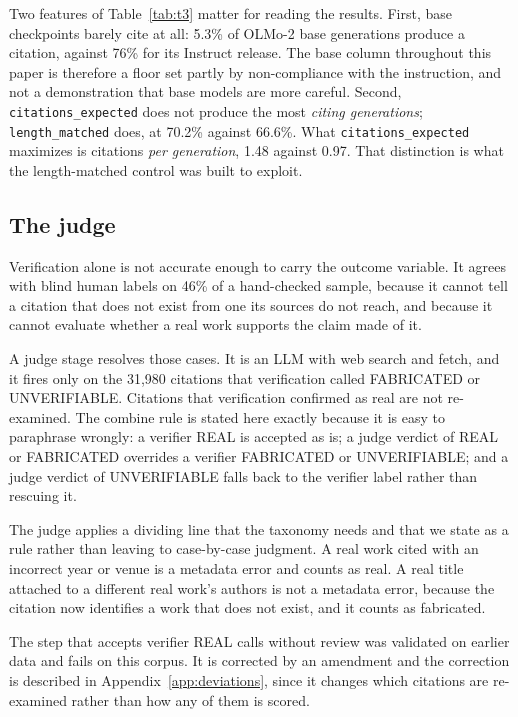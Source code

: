 Two features of Table~\ref{tab:t3} matter for reading the results. First, base
checkpoints barely cite at all: 5.3\% of OLMo-2 base generations produce a
citation, against 76\% for its Instruct release. The base column throughout this
paper is therefore a floor set partly by non-compliance with the instruction, and
not a demonstration that base models are more careful. Second,
\texttt{citations\_expected} does not produce the most \emph{citing generations};
\texttt{length\_matched} does, at 70.2\% against 66.6\%. What
\texttt{citations\_expected} maximizes is citations \emph{per generation}, 1.48
against 0.97. That distinction is what the length-matched control was built to
exploit.

\subsection{The judge}

Verification alone is not accurate enough to carry the outcome variable. It
agrees with blind human labels on 46\% of a hand-checked sample, because it
cannot tell a citation that does not exist from one its sources do not reach,
and because it cannot evaluate whether a real work supports the claim made of
it.

A judge stage resolves those cases. It is an LLM with web search and fetch, and
it fires only on the 31{,}980 citations that verification called FABRICATED or
UNVERIFIABLE. Citations that verification confirmed as real are not re-examined.
The combine rule is stated here exactly because it is easy to paraphrase
wrongly: a verifier REAL is accepted as is; a judge verdict of REAL or
FABRICATED overrides a verifier FABRICATED or UNVERIFIABLE; and a judge verdict
of UNVERIFIABLE falls back to the verifier label rather than rescuing it.

The judge applies a dividing line that the taxonomy needs and that we state as a
rule rather than leaving to case-by-case judgment. A real work cited with an
incorrect year or venue is a metadata error and counts as real. A real title
attached to a different real work's authors is not a metadata error, because the
citation now identifies a work that does not exist, and it counts as fabricated.

The step that accepts verifier REAL calls without review was validated on
earlier data and fails on this corpus. It is corrected by an amendment and the
correction is described in Appendix~\ref{app:deviations}, since it changes which
citations are re-examined rather than how any of them is scored.

